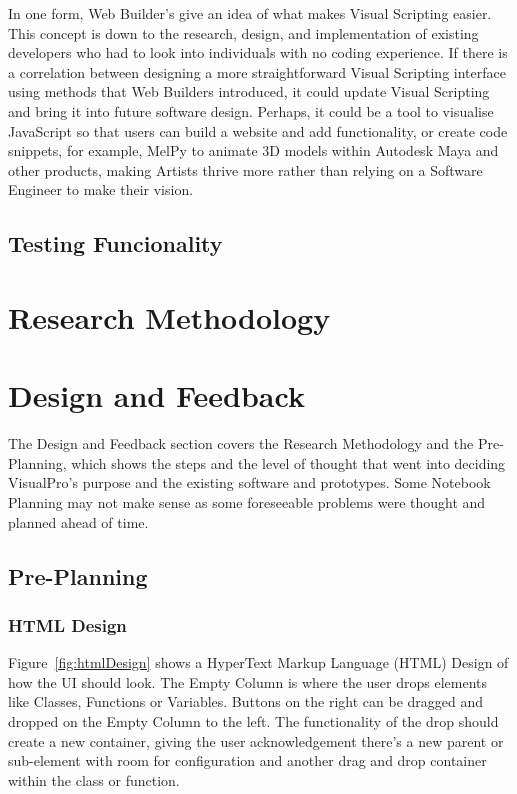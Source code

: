 \documentclass[12pt]{report} %
\begin{document}
			In one form, Web Builder's give an idea of what makes Visual Scripting easier. This concept is down to the research, design, and implementation of existing developers who had to look into individuals with no coding experience. If there is a correlation between designing a more straightforward Visual Scripting interface using methods that Web Builders introduced, it could update Visual Scripting and bring it into future software design. Perhaps, it could be a tool to visualise JavaScript so that users can build a website and add functionality, or create code snippets, for example, MelPy to animate 3D models within Autodesk Maya and other products, making Artists thrive more rather than relying on a Software Engineer to make their vision.
	\section{Testing Funcionality}
	
\chapter{Research Methodology}
\label{chap:researchMethodology}

\chapter{Design and Feedback}
\label{chap:designAndFeedback}
	The Design and Feedback section covers the Research Methodology and the Pre-Planning, which shows the steps and the level of thought that went into deciding VisualPro's purpose and the existing software and prototypes. Some Notebook Planning may not make sense as some foreseeable problems were thought and planned ahead of time.
	
	\section{Pre-Planning}
		\subsection{HTML Design} 
			Figure~\ref{fig:htmlDesign} shows a HyperText Markup Language (HTML) Design of how the UI should look. The Empty Column is where the user drops elements like Classes, Functions or Variables. Buttons on the right can be dragged and dropped on the Empty Column to the left. The functionality of the drop should create a new container, giving the user acknowledgement there's a new parent or sub-element with room for configuration and another drag and drop container within the class or function.
\end{document}
